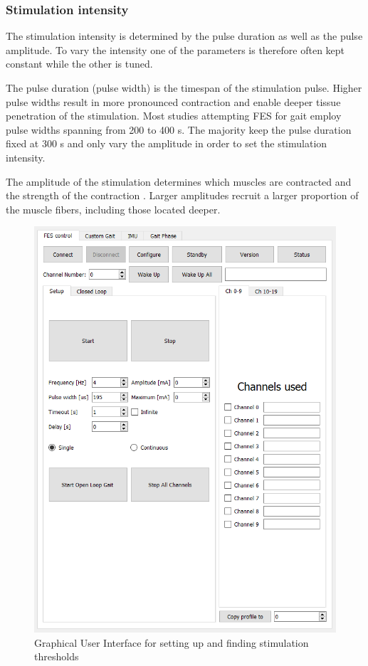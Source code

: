 \subsubsection{Stimulation intensity }
The stimulation intensity is determined by the pulse duration as well as the pulse amplitude. To vary the intensity one of the parameters is therefore often kept constant while the other is tuned. 

The pulse duration (pulse width) is the timespan of the stimulation pulse. Higher pulse widths result in more pronounced contraction and enable deeper tissue penetration of the stimulation. Most studies attempting FES for gait employ pulse widths spanning from 200 to 400 \micro s. The majority keep the pulse duration fixed at 300 \micro s and only vary the amplitude in order to set the stimulation intensity.\cite{aout_effects_2023}

The amplitude of the stimulation determines which muscles are contracted and the strength of the contraction \cite{marquez-chin_functional_2020}. Larger amplitudes recruit a larger proportion of the muscle fibers, including those located deeper. 

\begin{figure} [h]
    \centering
    \includegraphics[width=0.65\linewidth]{images/setupgui.png}
    \caption{Graphical User Interface for setting up and finding stimulation thresholds}
    \label{fig:setupgui}
\end{figure}

